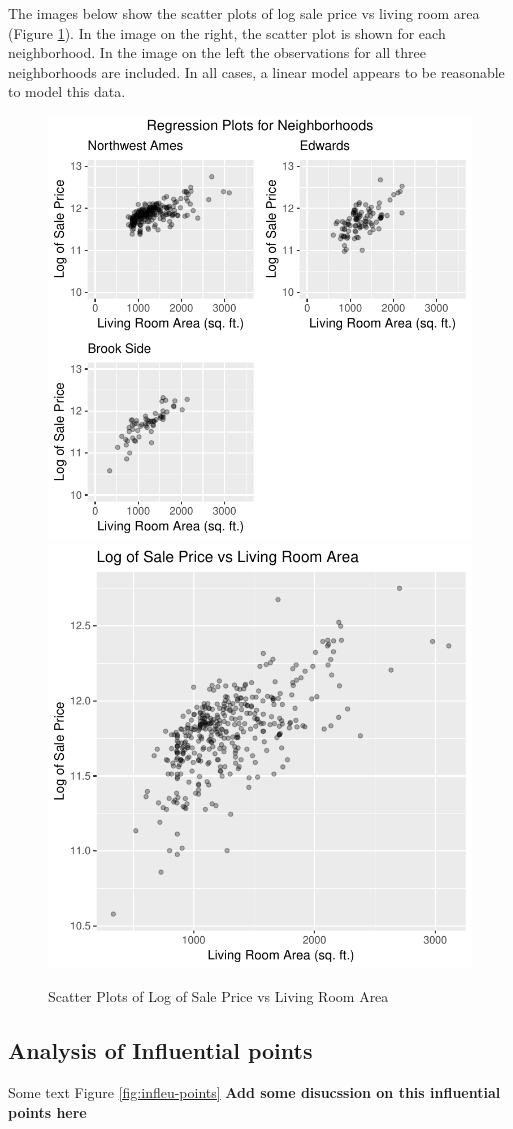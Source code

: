\documentclass[american,]{article}
\begin{document}
The images below show the scatter plots of log sale price vs living room
area (Figure \ref{fig:scatter-plots}). In the image on the right, the
scatter plot is shown for each neighborhood. In the image on the left
the observations for all three neighborhoods are included. In all cases,
a linear model appears to be reasonable to model this data.

\begin{figure}[htbp]

{\centering \includegraphics[width=0.45\linewidth]{HousePriceRegressionAnalysis_files/figure-latex/scatter-plots-1} \includegraphics[width=0.45\linewidth]{HousePriceRegressionAnalysis_files/figure-latex/scatter-plots-2} 

}

\caption{Scatter Plots of Log of Sale Price vs Living Room Area}\label{fig:scatter-plots}
\end{figure}

\hypertarget{analysis-of-influential-points}{%
\subsection{Analysis of Influential
points}\label{analysis-of-influential-points}}

Some text Figure \ref{fig:infleu-points} \textbf{Add some disucssion on
this influential points here}
\end{document}
